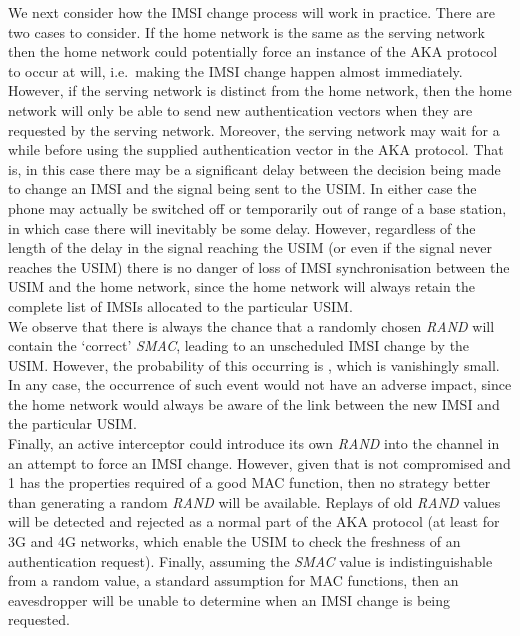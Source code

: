 \documentclass{acm_proc_article-sp}
\begin{document}
We next consider how the IMSI change process will work in practice. There are two cases to consider. If the home network is the same as the serving network then the home network could potentially force an instance of the AKA protocol to occur at will, i.e.\ making the IMSI change happen almost immediately. However, if the serving network is distinct from the home network, then the home network will only be able to send new authentication vectors when they are requested by the serving network. Moreover, the serving network may wait for a while before using the supplied authentication vector in the AKA protocol.  That is, in this case there may be a significant delay between the decision being made to change an IMSI and the signal being sent to the USIM\@. In either case the phone may actually be switched off or temporarily out of range of a base station, in which case there will inevitably be some delay. However, regardless of the length of the delay in the signal reaching the USIM (or even if the signal never reaches the USIM) there is no danger of loss of IMSI synchronisation between the USIM and the home network, since the home network will always retain the complete list of IMSIs allocated to the particular USIM\@. \\

We observe that there is always the chance that a randomly chosen \emph{RAND} will contain the `correct' \emph{SMAC}\@, leading to an unscheduled IMSI change by the USIM. However, the probability of this occurring is , which is vanishingly small. In any case, the occurrence of such event would not have an adverse impact, since the home network would always be aware of the link between the new IMSI and the particular USIM\@.   \\

Finally, an active interceptor could introduce its own \emph{RAND} into the channel in an attempt to force an IMSI change. However, given that  is not compromised and 1 has the properties required of a good MAC function, then no strategy better than generating a random \emph{RAND} will be available. Replays of old \emph{RAND} values will be detected and rejected as a normal part of the AKA protocol (at least for 3G and 4G networks, which enable the USIM to check the freshness of an authentication request). Finally, assuming the \emph{SMAC} value is indistinguishable from a random value, a standard assumption for MAC functions, then an eavesdropper will be unable to determine when an IMSI change is being requested.
\end{document}
